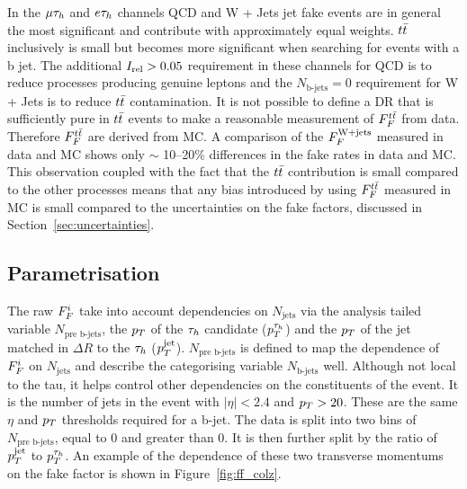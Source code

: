 In the $\mu\tau_{h}$ and $e\tau_{h}$ channels QCD and W + Jets jet fake events are in general the most significant and contribute with approximately equal weights. 
$t\bar{t}$ inclusively is small but becomes more significant when searching for events with a b jet. 
The additional $I_{\text{rel}}>0.05$ requirement in these channels for QCD is to reduce processes producing genuine leptons and the $N_{\text{b-jets}}=0$ requirement for W + Jets is to reduce $t\bar{t}$ contamination.
It is not possible to define a DR that is sufficiently pure in $t\bar{t}$ events to make a reasonable measurement of $F_{F}^{t\bar{t}}$ from data.
Therefore $F_{F}^{t\bar{t}}$ are derived from MC. 
A comparison of the $F_{F}^{\text{W+jets}}$ measured in data and MC shows only $\sim$ 10--20\% differences in the fake rates in data and MC.  
This observation coupled with the fact that the $t\bar{t}$ contribution is small compared to the other processes means that any bias introduced by using $F_{F}^{t\bar{t}}$ measured in MC is small compared to the uncertainties on the fake factors, discussed in Section~\ref{sec:uncertainties}. \\


\subsection{Parametrisation}

The raw $F_{F}^{i}$ take into account dependencies on $N_{\text{jets}}$ via the analysis tailed variable $N_{\text{pre b-jets}}$, the $p_{T}$ of the $\tau_{h}$ candidate ($p_{T}^{\tau_{h}}$) and the $p_{T}$ of the jet matched in $\Delta R$ to the $\tau_{h}$ ($p_{T}^{\text{jet}}$).
$N_{\text{pre b-jets}}$ is defined to map the dependence of $F_{F}^{i}$ on $N_{\text{jets}}$ and describe the categorising variable $N_{\text{b-jets}}$ well.
Although not local to the tau, it helps control other dependencies on the constituents of the event.
It is the number of jets in the event with $|\eta|<2.4$ and $p_{T}>20$. These are the same $\eta$ and $p_{T}$ thresholds required for a b-jet.
The data is split into two bins of $N_{\text{pre b-jets}}$, equal to 0 and greater than 0.
It is then further split by the ratio of $p_{T}^{\text{jet}}$ to $p_{T}^{\tau_{h}}$.
An example of the dependence of these two transverse momentums on the fake factor is shown in Figure~\ref{fig:ff_colz}.

